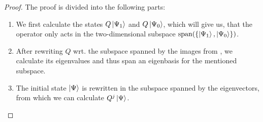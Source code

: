 \begin{proof}
    The proof is divided into the following parts:
    \begin{enumerate}[label=(\roman*)]
        \item[\ref{aa_iteration_proof_1}] \label{aa_iteration_proof_summary_1} We first calculate the states \(Q\ket{\Psi_1}\) and \(Q\ket{\Psi_0}\), which will give us, that the operator only acts in the two-dimensional subspace \(\operatorname{span}(\{\ket{\Psi_1}, \ket{\Psi_0}\})\).
        \item[\ref{aa_iteration_proof_2}] After rewriting \(Q\) wrt. the subspace spanned by the images from , we calculate its eigenvalues and thus span an eigenbasis for the mentioned subspace.
        \item[\ref{aa_iteration_proof_3}] The initial state \(\ket{\Psi}\) is rewritten in the subspace spanned by the eigenvectors, from which we can calculate \(Q^j\ket{\Psi}\).
    \end{enumerate}


\end{proof}
